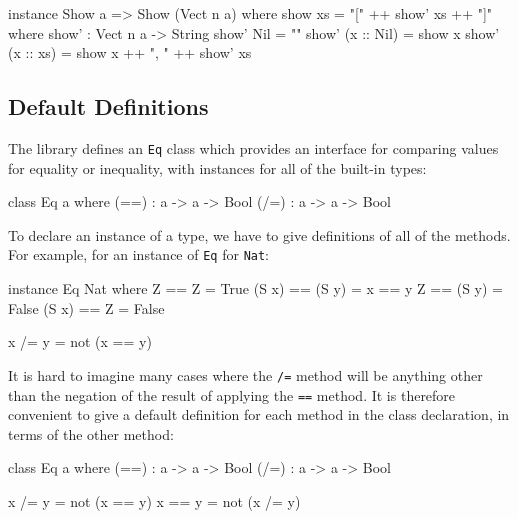 \begin{code}
instance Show a => Show (Vect n a) where
    show xs = "[" ++ show' xs ++ "]" where
        show' : Vect n a -> String
        show' Nil        = ""
        show' (x :: Nil) = show x
        show' (x :: xs)  = show x ++ ", " ++ show' xs
\end{code}


\subsection{Default Definitions}

The library defines an \texttt{Eq} class which provides an interface for comparing values for equality or inequality, with instances for all of the built-in types:

\begin{code}
class Eq a where
    (==) : a -> a -> Bool
    (/=) : a -> a -> Bool
\end{code}

\noindent
To declare an instance of a type, we have to give definitions of all of the methods.
For example, for an instance of \texttt{Eq} for \texttt{Nat}:

\begin{code}
instance Eq Nat where
    Z     == Z     = True
    (S x) == (S y) = x == y
    Z     == (S y) = False
    (S x) == Z     = False

    x /= y = not (x == y)
\end{code}

\noindent
It is hard to imagine many cases where the \texttt{/=} method will be anything other than the negation of the result of applying the \texttt{==} method.
It is therefore convenient to give a default definition for each method in the class declaration, in terms of the other method:

\begin{code}
class Eq a where
    (==) : a -> a -> Bool
    (/=) : a -> a -> Bool

    x /= y = not (x == y)
    x == y = not (x /= y)
\end{code}


